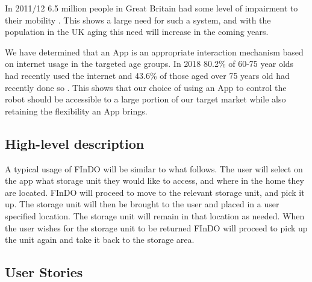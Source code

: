 \documentclass{article}
\begin{document}
In 2011/12 6.5 million people in Great Britain had some level of impairment to their mobility \cite{disabilitystats}. This shows a large need for such a system, and with the population in the UK aging \cite{agegrowth} this need will increase in the coming years.

We have determined that an App is an appropriate interaction mechanism based on internet usage in the targeted age groups. In 2018 80.2\% of 60-75 year olds had recently used the internet and 43.6\% of those aged over 75 years old had recently done so \cite{webage}. This shows that our choice of using an App to control the robot should be accessible to a large portion of our target market while also retaining the flexibility an App brings.

\subsection{High-level description} 
A typical usage of FInDO will be similar to what follows. The user will select on the app what storage unit they would like to access, and where in the home they are located. 
FInDO will proceed to move to the relevant storage unit, and pick it up. 
The storage unit will then be  brought to the user and placed in a user specified location. The storage unit will remain in that location as needed. When the user wishes for the storage unit to be returned FInDO will proceed to pick up the unit again and take it back to the  storage area.

\subsection{User Stories}
\end{document}
